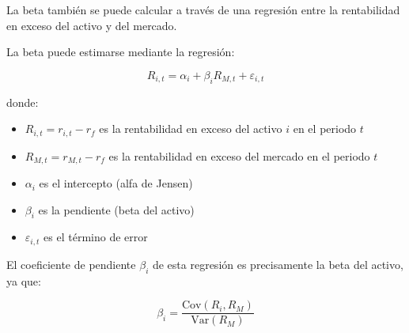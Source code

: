 La beta también se puede calcular a través de una regresión entre la rentabilidad en exceso del activo y del mercado.

\begin{proposicion}
La beta puede estimarse mediante la regresión:

\begin{equation}
R_{i,t} = \alpha_i + \beta_i R_{M,t} + \varepsilon_{i,t}
\end{equation}

donde:
\begin{itemize}
\item $R_{i,t} = r_{i,t} - r_f$ es la rentabilidad en exceso del activo $i$ en el periodo $t$
\item $R_{M,t} = r_{M,t} - r_f$ es la rentabilidad en exceso del mercado en el periodo $t$
\item $\alpha_i$ es el intercepto (alfa de Jensen)
\item $\beta_i$ es la pendiente (beta del activo)
\item $\varepsilon_{i,t}$ es el término de error
\end{itemize}
\end{proposicion}

El coeficiente de pendiente $\beta_i$ de esta regresión es precisamente la beta del activo, ya que:

\begin{equation}
\beta_i = \frac{\text{Cov}(R_i, R_M)}{\text{Var}(R_M)}
\end{equation}

